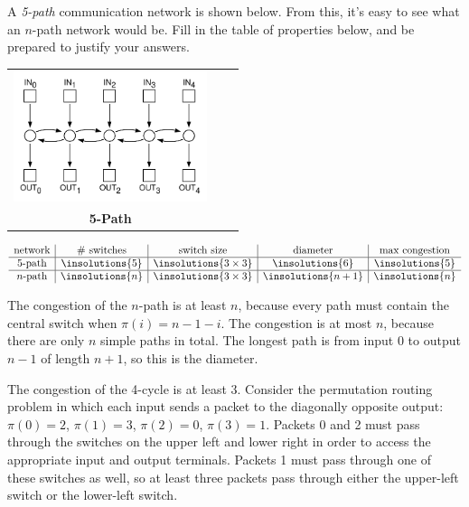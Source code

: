 
\begin{problem}
A \emph{5-path} communication network is shown below.  From this, it's
easy to see what an $n$-path network would be.  Fill in the table of
properties below, and be prepared to justify your answers.

\begin{center}
\begin{tabular}{ccc}
\includegraphics[height=1.5in]{figures/line-nw}\\
\textbf{5-Path}%
\end{tabular}
\end{center}

{\large
\[
\begin{array}{c|c|c|c|c}
\text{network} &
\text{\# switches} &
\text{switch size} &
\text{diameter} &
\text{max congestion} \\ \hline
\text{5-path} &
\insolutions{5} &
\insolutions{3 \times 3} &
\insolutions{6} &
\insolutions{5} \\ \hline
\text{$n$-path} &
\insolutions{n} &
\insolutions{3 \times 3} &
\insolutions{n+1} &
\insolutions{n}
\end{array}
\]
}

\begin{solution}
The congestion of the $n$-path is at least $n$, because every
path must contain the central switch when $\pi(i) = n- 1 - i$.  The congestion
is at most $n$, because there are only $n$ simple paths in total.  The longest
path is from input 0 to output $n-1$ of length $n+1$, so this is the
diameter.
\end{solution}

\iffalse
The congestion of the 4-cycle is at least 3.  Consider the permutation
routing problem in which each input sends a packet to the diagonally
opposite output: $\pi(0) = 2$, $\pi(1) = 3$, $\pi(2) = 0$, $\pi(3) =
1$.  Packets 0 and 2 must pass through the switches on the upper left
and lower right in order to access the appropriate input and output
terminals.  Packets 1 must pass through one of these switches as well,
so at least three packets pass through either the upper-left switch or
the lower-left switch.


\end{problem}
